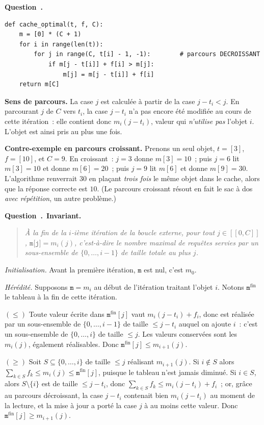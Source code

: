 \documentclass[11pt,a4paper]{article}
\renewcommand{\Q}{\medskip\par\stepcounter{qcnt}\noindent\textbf{\color{cnc}Question~\theqcnt.}~}
\begin{document}
\Q
\begin{lstlisting}
def cache_optimal(t, f, C):
    m = [0] * (C + 1)
    for i in range(len(t)):
        for j in range(C, t[i] - 1, -1):        # parcours DECROISSANT
            if m[j - t[i]] + f[i] > m[j]:
                m[j] = m[j - t[i]] + f[i]
    return m[C]
\end{lstlisting}
\textbf{Sens de parcours.} La case $j$ est calculée à partir de la case $j-t_i<j$. En
parcourant $j$ de $C$ vers $t_i$, la case $j-t_i$ n'a pas encore été modifiée au cours de
cette itération~: elle contient donc $m_i(j-t_i)$, valeur qui \emph{n'utilise pas} l'objet
$i$. L'objet est ainsi pris au plus une fois.

\textbf{Contre-exemple en parcours croissant.} Prenons un seul objet, $t=[3]$, $f=[10]$, et
$C=9$. En croissant~: $j=3$ donne $m[3]=10$~; puis $j=6$ lit $m[3]=10$ et donne $m[6]=20$~;
puis $j=9$ lit $m[6]$ et donne $m[9]=30$. L'algorithme renverrait $30$ en plaçant
\emph{trois fois} le même objet dans le cache, alors que la réponse correcte est $10$. (Le
parcours croissant résout en fait le sac à dos \emph{avec répétition}, un autre problème.)

\Q \textbf{Invariant.}
\begin{quote}\itshape
À la fin de la $i$-ième itération de la boucle externe, pour tout $j\in[\![0,C]\!]$,
$\texttt{m[j]}=m_i(j)$, c'est-à-dire le nombre maximal de requêtes servies par un sous-ensemble
de $\{0,\dots,i-1\}$ de taille totale au plus $j$.
\end{quote}
\emph{Initialisation.} Avant la première itération, $\texttt{m}$ est nul, c'est $m_0$.

\emph{Hérédité.} Supposons $\texttt{m}=m_i$ au début de l'itération traitant l'objet $i$.
Notons $\texttt{m}^{\text{fin}}$ le tableau à la fin de cette itération.

$(\le)$ Toute valeur écrite dans $\texttt{m}^{\text{fin}}[j]$ vaut $m_i(j-t_i)+f_i$, donc est
réalisée par un sous-ensemble de $\{0,\dots,i-1\}$ de taille $\le j-t_i$ auquel on ajoute
$i$~: c'est un sous-ensemble de $\{0,\dots,i\}$ de taille $\le j$. Les valeurs conservées
sont les $m_i(j)$, également réalisables. Donc
$\texttt{m}^{\text{fin}}[j]\le m_{i+1}(j)$.

$(\ge)$ Soit $S\subseteq\{0,\dots,i\}$ de taille $\le j$ réalisant $m_{i+1}(j)$. Si
$i\notin S$ alors $\sum_{k\in S}f_k\le m_i(j)\le\texttt{m}^{\text{fin}}[j]$, puisque le tableau
n'est jamais diminué. Si $i\in S$, alors $S\setminus\{i\}$ est de taille $\le j-t_i$, donc
$\sum_{k\in S}f_k\le m_i(j-t_i)+f_i$~; or, grâce au parcours décroissant, la case $j-t_i$
contenait bien $m_i(j-t_i)$ au moment de la lecture, et la mise à jour a porté la case $j$ à
au moins cette valeur. Donc $\texttt{m}^{\text{fin}}[j]\ge m_{i+1}(j)$.
\end{document}
